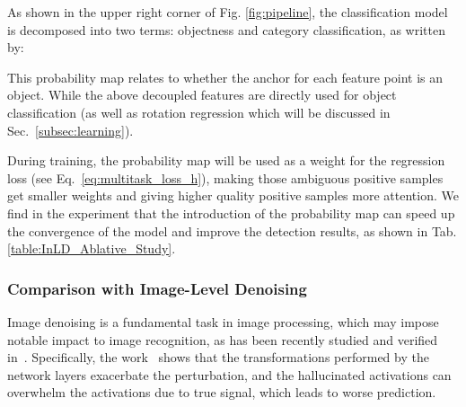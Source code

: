 \documentclass[10pt,journal,compsoc]{IEEEtran}
\begin{document}
As shown in the upper right corner of Fig. \ref{fig:pipeline}, the classification model is decomposed into two terms: objectness and category classification, as written by:


This probability map  relates to whether the anchor for each feature point is an object. While the above decoupled features are directly used for object classification  (as well as rotation regression which will be discussed in Sec.~\ref{subsec:learning}). 





During training, the probability map   will be used as a weight for the regression loss (see Eq.~\ref{eq:multitask_loss_h}), making those ambiguous positive samples get smaller weights and giving higher quality positive samples more attention. We find in the experiment that the introduction of the probability map can speed up the convergence of the model and improve the detection results, as shown in Tab. \ref{table:InLD_Ablative_Study}. 

\begin{table}[tb!]
	\centering
	\caption{Ablative study of five image level denoising settings as used in \cite{xie2019feature} on the OBB task of DOTA-v1.0 dataset.}
	\label{table:ImLD_Ablation_Study}
\end{table}

\subsubsection{Comparison with Image-Level Denoising}\label{subsec:ImLD}
Image denoising is a fundamental task in image processing, which may impose notable impact to image recognition, as has been recently studied and verified in~\cite{xie2019feature}. Specifically, the work~\cite{xie2019feature} shows that the transformations performed by the network layers exacerbate the perturbation, and the hallucinated activations can overwhelm the activations due to true signal, which leads to worse prediction.  
\end{document}
